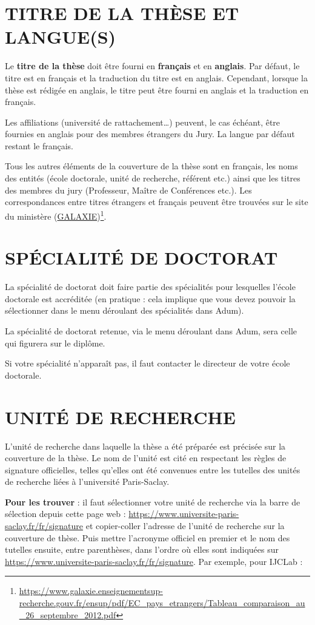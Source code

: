 \documentclass[main=french,a4paper]{book}
\begin{document}
\section{TITRE DE LA THÈSE ET LANGUE(S)}
Le \textbf{titre de la thèse} doit être fourni en \textbf{français} et en \textbf{anglais}. Par défaut, le titre est en français et la traduction du titre est en anglais. Cependant, lorsque la thèse est rédigée en anglais, le titre peut être fourni en anglais et la traduction en français.\\ \par
Les affiliations (université de rattachement…) peuvent, le cas échéant, être fournies en anglais pour des membres étrangers du Jury. La langue par défaut restant le français.\\ \par
Tous les autres éléments de la couverture de la thèse sont en français, les noms des entités (école doctorale, unité de recherche, référent etc.) ainsi que les titres des membres du jury (Professeur, Maître de Conférences etc.). Les correspondances entre titres étrangers et français peuvent être trouvées sur le site du ministère (\href{https://www.galaxie.enseignementsup-recherche.gouv.fr/ensup/pdf/EC_pays_etrangers/Tableau_comparaison_au_26_septembre_2012.pdf}{GALAXIE})\footnote{\url{https://www.galaxie.enseignementsup-recherche.gouv.fr/ensup/pdf/EC_pays_etrangers/Tableau_comparaison_au_26_septembre_2012.pdf}}.
\section{SPÉCIALITÉ DE DOCTORAT}
La spécialité de doctorat doit faire partie des spécialités pour lesquelles l’école doctorale est accréditée (en pratique : cela implique que vous devez pouvoir la sélectionner dans le menu déroulant des spécialités dans Adum). \\ \par
La spécialité de doctorat retenue, via le menu déroulant dans Adum, sera celle qui figurera sur le diplôme.\\ \par
Si votre spécialité n’apparaît pas, il faut contacter le directeur de votre école doctorale.
\newpage
\section{UNITÉ DE RECHERCHE}
L’unité de recherche dans laquelle la thèse a été préparée est précisée sur la couverture de la thèse. Le nom de l’unité est cité en respectant les règles de signature officielles, telles qu’elles ont été convenues entre les tutelles des unités de recherche liées à l’université Paris-Saclay.\\ \par
\textbf{Pour les trouver} : il faut sélectionner votre unité de recherche via la barre de sélection depuis cette page web : \url{https://www.universite-paris-saclay.fr/fr/signature} et copier-coller l’adresse de l’unité de recherche sur la couverture de thèse. 
Puis mettre l’acronyme officiel en  premier et le nom des tutelles ensuite, entre parenthèses, dans l’ordre où elles sont indiquées sur \url{https://www.universite-paris-saclay.fr/fr/signature}.
Par exemple, pour IJCLab :
\end{document}
